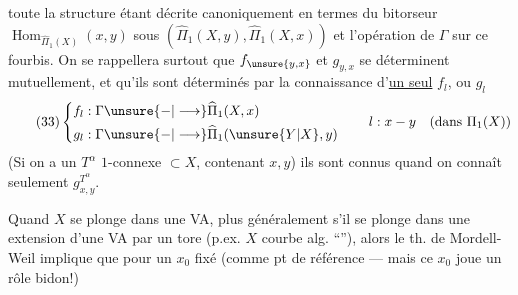 toute la structure étant décrite canoniquement en termes du bitorseur $\operatorname{Hom}_{\widehat\Pi_1(X)}(x,y)$ sous $(\widehat\Pi_1(X,y),\widehat\Pi_1(X,x))$ et l'opération de $\Gamma$ sur  ce fourbis. On se rappellera surtout que $f_{\unsure{y,x}}$ et $g_{y,x}$ se déterminent mutuellement, et qu'ils sont déterminés par la connaissance d'\uline{un seul}   $f_l$, ou $g_l$
\[
\tag{33}\left\{\begin{aligned}
f_l&:\Gamma\unsure{\mathbin{-}|\longrightarrow}\widehat\Pi_1(X,x)\\
g_l&:\Gamma\unsure{\mathbin{-}|\longrightarrow}\widehat\Pi_1(\unsure{Y|X},y)
\end{aligned}\right.
\qquad l:x\mathbin{-}y\quad(\text{dans }\Pi_1(X))
\]
(Si on a  un $T^\alpha$ $1$-connexe $\subset X$, contenant $x,y$) ils sont connus quand on connaît seulement $g^{T^\alpha}_{x,y}$.


Quand $X$ se plonge dans une VA, plus généralement s'il se plonge dans une extension d'une VA par un tore (p.ex. $X$ courbe alg. ``''), alors le th. de Mordell-Weil implique que pour un $x_0$  fixé (comme pt de référence --- mais ce $x_0$  joue un rôle bidon!)
